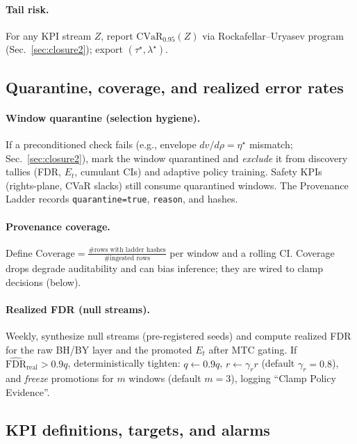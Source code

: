 \documentclass[10pt]{article}
\newcommand{\cutq}{q}
\begin{document}
\paragraph{Tail risk.}
For any KPI stream $Z$, report $\mathrm{CVaR}_{0.95}(Z)$ via Rockafellar–Uryasev program (Sec.~\ref{sec:closure2}); export $(\tau^\star,\lambda^\star)$.

\subsection*{Quarantine, coverage, and realized error rates}

\paragraph{Window quarantine (selection hygiene).}
If a preconditioned check fails (e.g., envelope $dv/d\rho=\eta^\star$ mismatch; Sec.~\ref{sec:closure2}), mark the window \textsf{quarantined} and \emph{exclude} it from discovery tallies (FDR, $E_t$, cumulant CIs) and adaptive policy training. Safety KPIs (rights-plane, CVaR slacks) still consume quarantined windows. The Provenance Ladder records \texttt{quarantine=true}, \texttt{reason}, and hashes.

\paragraph{Provenance coverage.}
Define $\mathrm{Coverage}=\frac{\#\text{rows with ladder hashes}}{\#\text{ingested rows}}$ per window and a rolling CI. Coverage drops degrade auditability and can bias inference; they are wired to clamp decisions (below).

\paragraph{Realized FDR (null streams).}
Weekly, synthesize null streams (pre-registered seeds) and compute realized FDR for the raw BH/BY layer and the promoted $E_t$ after MTC gating. If $\widehat{\mathrm{FDR}}_{\mathrm{real}}>0.9\cutq$, deterministically tighten:
$q\leftarrow0.9q$, $r\leftarrow \gamma_r r$ (default $\gamma_r=0.8$), and \emph{freeze} promotions for $m$ windows (default $m=3$), logging “Clamp Policy Evidence”.

\subsection*{KPI definitions, targets, and alarms}
\end{document}

